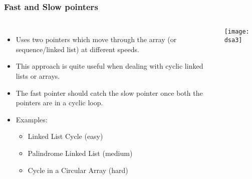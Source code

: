 \begin{frame}[fragile]
	\frametitle{Fast and Slow pointers}
	
	\begin{columns}[T]
			\begin{itemize}
				\item Uses two pointers which move through the array (or sequence/linked list) at different speeds. 
				\item This approach is quite useful when dealing with cyclic linked lists or arrays.
				\item The fast pointer should catch the slow pointer once both the pointers are in a cyclic loop.
				\item Examples:
			\begin{itemize}
				\item Linked List Cycle (easy)
				\item Palindrome Linked List (medium)
				\item Cycle in a Circular Array (hard)
			\end{itemize}

			\end{itemize}
			
		
\begin{center}
\texttt{[image: dsa3]}
\end{center}			
	\end{columns}		
\end{frame}

